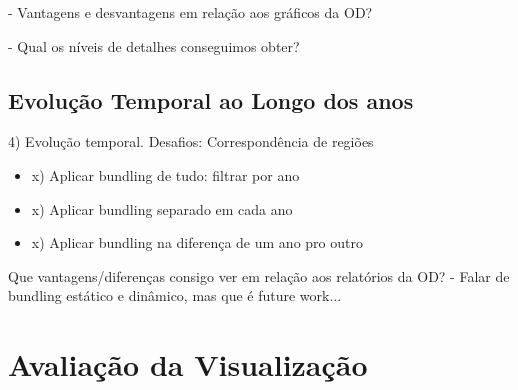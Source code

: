 	- Vantagens e desvantagens em relação aos gráficos da OD?

	- Qual os níveis de detalhes conseguimos obter?


\subsection{Evolução Temporal ao Longo dos anos}

4) Evolução temporal. Desafios: Correspondência de regiões

  \begin{itemize}
    \item x) Aplicar bundling de tudo: filtrar por ano
    \item x) Aplicar bundling separado em cada ano
    \item x) Aplicar bundling na diferença de um ano pro outro
  \end{itemize}

	Que vantagens/diferenças consigo ver em relação aos relatórios da OD?
	- Falar de bundling estático e dinâmico, mas que é future work...


\section{Avaliação da Visualização} 
